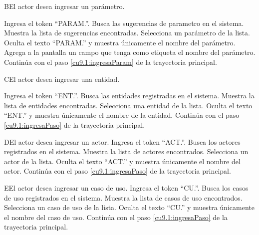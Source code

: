  \begin{UCtrayectoriaA}{B}{El actor desea ingresar un parámetro.}
 	
 	 \UCpaso[\UCactor] Ingresa el token ``PARAM.''.
 	\UCpaso[\UCsist] Busca las sugerencias de parametro en el sistema. 
 	\UCpaso[\UCsist] Muestra la lista de sugerencias encontradas.
 	\UCpaso[\UCactor] Selecciona un parámetro de la lista.
  	\UCpaso[\UCsist] Oculta el texto ``PARAM.'' y muestra únicamente el nombre del parámetro.
  	\UCpaso[\UCsist] Agrega a la pantalla un campo que tenga como etiqueta el nombre del parámetro. 
    \UCpaso[] Continúa con el paso \ref{cu9.1:ingresaParam} de la trayectoria principal.
 \end{UCtrayectoriaA}
 \begin{UCtrayectoriaA}{C}{El actor desea ingresar una entidad.}
 	
 	 \UCpaso[\UCactor] Ingresa el token ``ENT.''.
 	\UCpaso[\UCsist] Busca las entidades registradas en el sistema. 
 	\UCpaso[\UCsist] Muestra la lista de entidades encontradas.
 	\UCpaso[\UCactor] Selecciona una entidad de la lista.
  	\UCpaso[\UCsist] Oculta el texto ``ENT.'' y muestra únicamente el nombre de la entidad.
    \UCpaso[] Continúa con el paso \ref{cu9.1:ingresaPaso} de la trayectoria principal.
 \end{UCtrayectoriaA}
 \begin{UCtrayectoriaA}{D}{El actor desea ingresar un actor.}
 	\UCpaso[\UCactor] Ingresa el token ``ACT.''.
 	\UCpaso[\UCsist] Busca los actores registrados en el sistema. 
 	\UCpaso[\UCsist] Muestra la lista de actores encontrados.
 	\UCpaso[\UCactor] Selecciona un actor de la lista.
  	\UCpaso[\UCsist] Oculta el texto ``ACT.'' y muestra únicamente el nombre del actor.
    \UCpaso[] Continúa con el paso \ref{cu9.1:ingresaPaso} de la trayectoria principal.
 \end{UCtrayectoriaA}

 \begin{UCtrayectoriaA}{E}{El actor desea ingresar un caso de uso.}
  	\UCpaso[\UCactor] Ingresa el token ``CU.''.	
 	\UCpaso[\UCsist] Busca los casos de uso registrados en el sistema. 
 	\UCpaso[\UCsist] Muestra la lista de casos de uso encontrados.
 	\UCpaso[\UCactor] Selecciona un caso de uso de la lista.
  	\UCpaso[\UCsist] Oculta el texto ``CU.'' y muestra únicamente el nombre del caso de uso.
    \UCpaso[] Continúa con el paso \ref{cu9.1:ingresaPaso} de la trayectoria principal.
 \end{UCtrayectoriaA}

